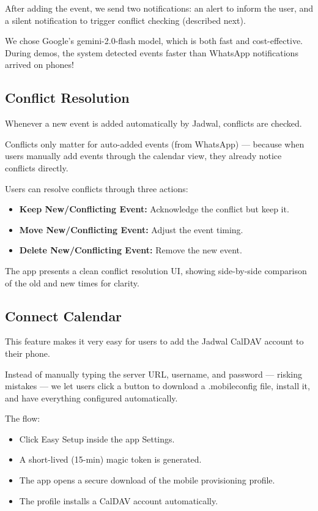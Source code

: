 After adding the event, we send two notifications: an alert to inform the user, and a silent notification to trigger conflict checking (described next).

We chose Google’s gemini-2.0-flash model, which is both fast and cost-effective. During demos, the system detected events faster than WhatsApp notifications arrived on phones!

\subsection{Conflict Resolution} \label{subsec:conflict-resolution}

Whenever a new event is added automatically by Jadwal, conflicts are checked.

Conflicts only matter for auto-added events (from WhatsApp) — because when users manually add events through the calendar view, they already notice conflicts directly.

Users can resolve conflicts through three actions: \begin{itemize} \item \textbf{Keep New/Conflicting Event:} Acknowledge the conflict but keep it. \item \textbf{Move New/Conflicting Event:} Adjust the event timing. \item \textbf{Delete New/Conflicting Event:} Remove the new event. \end{itemize}

The app presents a clean conflict resolution UI, showing side-by-side comparison of the old and new times for clarity.

\subsection{Connect Calendar} \label{subsec:connect-calendar}

This feature makes it very easy for users to add the Jadwal CalDAV account to their phone.

Instead of manually typing the server URL, username, and password — risking mistakes — we let users click a button to download a .mobileconfig file, install it, and have everything configured automatically.

The flow: \begin{itemize} \item Click Easy Setup inside the app Settings. \item A short-lived (15-min) magic token is generated. \item The app opens a secure download of the mobile provisioning profile. \item The profile installs a CalDAV account automatically. \end{itemize}


